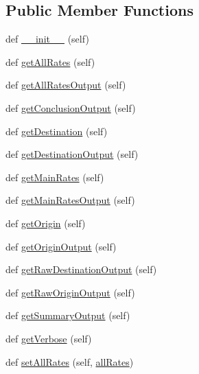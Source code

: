 \subsection*{Public Member Functions}
\begin{DoxyCompactItemize}
\item 
def \hyperlink{classe2e_1_1_parameters_a335faddfa9af3ed8ac441e92faec0946}{\+\_\+\+\_\+init\+\_\+\+\_\+} (self)
\item 
def \hyperlink{classe2e_1_1_parameters_a73ef5c8c54974e3ce7a2a522c299fd34}{get\+All\+Rates} (self)
\item 
def \hyperlink{classe2e_1_1_parameters_af47d493a07f5127e633d5efccb5fac5e}{get\+All\+Rates\+Output} (self)
\item 
def \hyperlink{classe2e_1_1_parameters_ac4ff6b23493a25723cfe99fb7becf328}{get\+Conclusion\+Output} (self)
\item 
def \hyperlink{classe2e_1_1_parameters_ad984826a5973fff569b554b44245b714}{get\+Destination} (self)
\item 
def \hyperlink{classe2e_1_1_parameters_a4451a6d8224c2216fdef8e53e55fadaf}{get\+Destination\+Output} (self)
\item 
def \hyperlink{classe2e_1_1_parameters_a067ce19caffb5ed5479219a911219c31}{get\+Main\+Rates} (self)
\item 
def \hyperlink{classe2e_1_1_parameters_a7f42c96565591076b9ae5b06ce364bec}{get\+Main\+Rates\+Output} (self)
\item 
def \hyperlink{classe2e_1_1_parameters_ac570cc2f199bcb82a4634be79110a013}{get\+Origin} (self)
\item 
def \hyperlink{classe2e_1_1_parameters_af0cdd8e6726ccc72387e466c2abe04c2}{get\+Origin\+Output} (self)
\item 
def \hyperlink{classe2e_1_1_parameters_a0536c6870c6371025927f435e47704ed}{get\+Raw\+Destination\+Output} (self)
\item 
def \hyperlink{classe2e_1_1_parameters_a4ed96c7861e649d101984ff5c8056691}{get\+Raw\+Origin\+Output} (self)
\item 
def \hyperlink{classe2e_1_1_parameters_a46f3f35e99d7ce8a22fa34d66a348586}{get\+Summary\+Output} (self)
\item 
def \hyperlink{classe2e_1_1_parameters_a1e5e7e1986b641b01d4c24690a6d48eb}{get\+Verbose} (self)
\item 
def \hyperlink{classe2e_1_1_parameters_a764caaf0903863ccf240217b15999dc0}{set\+All\+Rates} (self, \hyperlink{classe2e_1_1_parameters_a60eeea35185af8b13a6ea9d797a38dc7}{all\+Rates})
\item 

\end{DoxyCompactItemize}
